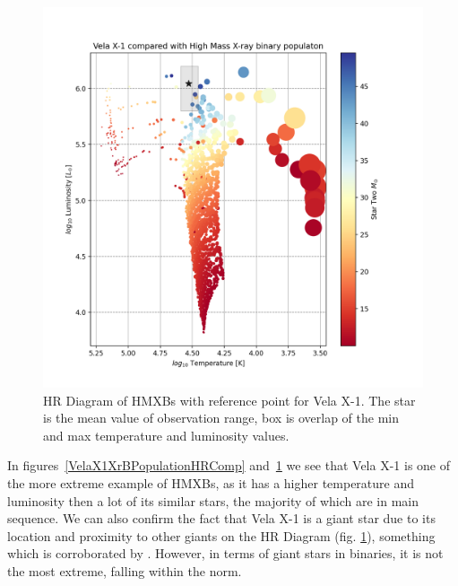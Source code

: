 \documentclass[12pt, a4paper]{article}
\begin{document}
            \begin{figure}[H] 
                \centering
                \includegraphics[scale = .5]{figs/GeneratedFigs/VelaX-1/VelaX1HMXBPopulationHRComp.png}
                \caption{HR Diagram of HMXBs with reference point for Vela X-1. The star is the mean value of observation range, box is overlap of the min and max temperature and luminosity values.}
                \label{VelaX1HMXBPopulationHRComp}
            \end{figure}


        In figures~\ref{VelaX1XrBPopulationHRComp} and~\ref{VelaX1HMXBPopulationHRComp} we see that Vela X-1 is one of the more extreme example of HMXBs, as it has a higher temperature and luminosity then a lot of its similar stars, the majority of which are in main sequence. We can also confirm the fact that Vela X-1 is a giant star due to its location and proximity to other giants on the HR Diagram (fig. \ref{VelaX1HMXBPopulationHRComp}), something which is corroborated by \parencite{Kretschmar_2021}. However, in terms of giant stars in binaries, it is not the most extreme, falling within the norm.
    
\end{document}
